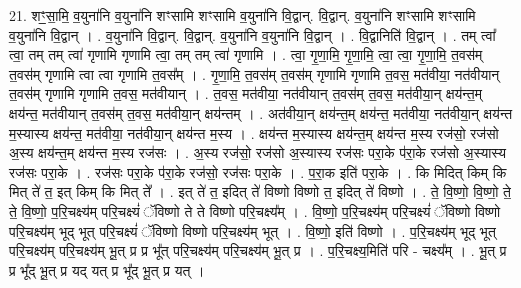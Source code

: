 \documentclass[17pt]{extarticle}
\begin{document}
21. शꣳ॒॒सा॒मि॒ व॒युना॑नि व॒युना॑नि शꣳसामि शꣳसामि व॒युना॑नि वि॒द्वान्. वि॒द्वान्. व॒युना॑नि शꣳसामि शꣳसामि व॒युना॑नि वि॒द्वान् । . व॒युना॑नि वि॒द्वान्. वि॒द्वान्. व॒युना॑नि व॒युना॑नि वि॒द्वान् । . वि॒द्वानिति॑ वि॒द्वान् । . तम् त्वा᳚ त्वा॒ तम् तम् त्वा॑ गृणामि गृणामि त्वा॒ तम् तम् त्वा॑ गृणामि । . त्वा॒ गृ॒णा॒मि॒ गृ॒णा॒मि॒ त्वा॒ त्वा॒ गृ॒णा॒मि॒ त॒वस॑म् त॒वस॑म् गृणामि त्वा त्वा गृणामि त॒वस᳚म् । . गृ॒णा॒मि॒ त॒वस॑म् त॒वस॑म् गृणामि गृणामि त॒वस॒ मत॑वीया॒ नत॑वीयान् त॒वस॑म् गृणामि गृणामि त॒वस॒ मत॑वीयान् । . त॒वस॒ मत॑वीया॒ नत॑वीयान् त॒वस॑म् त॒वस॒ मत॑वीया॒न् क्षय॑न्त॒म् क्षय॑न्त॒ मत॑वीयान् त॒वस॑म् त॒वस॒ मत॑वीया॒न् क्षय॑न्तम् । . अत॑वीया॒न् क्षय॑न्त॒म् क्षय॑न्त॒ मत॑वीया॒ नत॑वीया॒न् क्षय॑न्त म॒स्यास्य क्षय॑न्त॒ मत॑वीया॒ नत॑वीया॒न् क्षय॑न्त म॒स्य । . क्षय॑न्त म॒स्यास्य क्षय॑न्त॒म् क्षय॑न्त म॒स्य रज॑सो॒ रज॑सो अ॒स्य क्षय॑न्त॒म् क्षय॑न्त म॒स्य रज॑सः । . अ॒स्य रज॑सो॒ रज॑सो अ॒स्यास्य रज॑सः परा॒के प॑रा॒के रज॑सो अ॒स्यास्य रज॑सः परा॒के । . रज॑सः परा॒के प॑रा॒के रज॑सो॒ रज॑सः परा॒के । . प॒रा॒क इति॑ परा॒के । . कि मिदित् किम् कि मित् ते॑ त॒ इत् किम् कि मित् ते᳚ । . इत् ते॑ त॒ इदित् ते॑ विष्णो विष्णो त॒ इदित् ते॑ विष्णो । . ते॒ वि॒ष्णो॒ वि॒ष्णो॒ ते॒ ते॒ वि॒ष्णो॒ प॒रि॒चक्ष्य॑म् परि॒चक्ष्यं॑ ॅविष्णो ते ते विष्णो परि॒चक्ष्य᳚म् । . वि॒ष्णो॒ प॒रि॒चक्ष्य॑म् परि॒चक्ष्यं॑ ॅविष्णो विष्णो परि॒चक्ष्य॑म् भूद् भूत् परि॒चक्ष्यं॑ ॅविष्णो विष्णो परि॒चक्ष्य॑म् भूत् । . वि॒ष्णो॒ इति॑ विष्णो । . प॒रि॒चक्ष्य॑म् भूद् भूत् परि॒चक्ष्य॑म् परि॒चक्ष्य॑म् भू॒त् प्र प्र भू᳚त् परि॒चक्ष्य॑म् परि॒चक्ष्य॑म् भू॒त् प्र । . प॒रि॒चक्ष्य॒मिति॑ परि - चक्ष्य᳚म् । . भू॒त् प्र प्र भू᳚द् भू॒त् प्र यद् यत् प्र भू᳚द् भू॒त् प्र यत् । \newline
\end{document}

